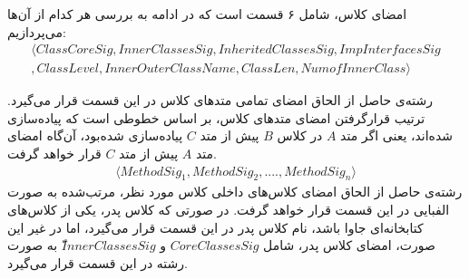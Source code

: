 
امضای کلاس، شامل ۶ قسمت است که در ادامه به بررسی هر کدام از آن‌ها می‌پردازیم: 
\begin{equation}
\begin{split}
\langle ClassCoreSig,InnerClassesSig,InheritedClassesSig,ImpInterfacesSig\\
,ClassLevel,InnerOuterClassName,ClassLen,NumofInnerClass \rangle
\end{split}
\end{equation}

 رشته‌ی حاصل از الحاق امضای تمامی متد‌های کلاس در این قسمت قرار می‌گیرد. ترتیب قرار‌گرفتن امضای متد‌های کلاس، بر اساس خطوطی است که پیاده‌سازی شده‌اند، یعنی اگر متد $A$ در کلاس $B$ پیش از متد $C$ پیاده‌سازی شده‌بود، آن‌گاه امضای متد $A$ پیش از متد $C$ قرار خواهد گرفت.
\begin{equation}
\begin{split}
\langle MethodSig_1,MethodSig_2, ...., MethodSig_n \rangle
\end{split}
\end{equation}
 رشته‌ی حاصل از الحاق امضای کلاس‌های داخلی کلاس مورد نظر، مرتب‌شده به صورت الفبایی در این قسمت قرار خواهد گرفت.
 در صورتی که کلاس پدر، یکی از کلاس‌های کتابخانه‌ای جاوا باشد، نام کلاس پدر در این قسمت قرار می‌گیرد، اما در غیر این صورت، امضای کلاس پدر، شامل $CoreClassesSig$ و $ّInnerClassesSig$ به صورت رشته در این قسمت قرار می‌گیرد.

